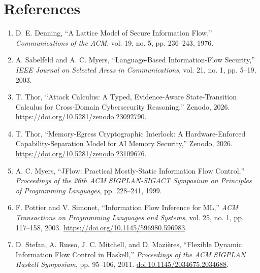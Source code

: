 \documentclass[11pt,letterpaper]{article}
\begin{document}
\section*{References}
\small
\begin{enumerate}\setlength{\itemsep}{2pt}\setlength{\parskip}{0pt}
\item D. E. Denning, ``A Lattice Model of Secure Information Flow,'' \emph{Communications of the ACM}, vol. 19, no. 5, pp. 236--243, 1976.
\item A. Sabelfeld and A. C. Myers, ``Language-Based Information-Flow Security,'' \emph{IEEE Journal on Selected Areas in Communications}, vol. 21, no. 1, pp. 5--19, 2003.
\item T. Thor, ``Attack Calculus: A Typed, Evidence-Aware State-Transition Calculus for Cross-Domain Cybersecurity Reasoning,'' Zenodo, 2026. \url{https://doi.org/10.5281/zenodo.23092790}.
\item T. Thor, ``Memory-Egress Cryptographic Interlock: A Hardware-Enforced Capability-Separation Model for AI Memory Security,'' Zenodo, 2026. \url{https://doi.org/10.5281/zenodo.23109676}.
\item A. C. Myers, ``JFlow: Practical Mostly-Static Information Flow Control,'' \emph{Proceedings of the 26th ACM SIGPLAN-SIGACT Symposium on Principles of Programming Languages}, pp. 228--241, 1999.
\item F. Pottier and V. Simonet, ``Information Flow Inference for ML,'' \emph{ACM Transactions on Programming Languages and Systems}, vol. 25, no. 1, pp. 117--158, 2003. \url{https://doi.org/10.1145/596980.596983}.
\item D. Stefan, A. Russo, J. C. Mitchell, and D. Mazi\`eres, ``Flexible Dynamic Information Flow Control in Haskell,'' \emph{Proceedings of the ACM SIGPLAN Haskell Symposium}, pp. 95--106, 2011. \href{https://doi.org/10.1145/2034675.2034688}{doi:10.1145/2034675.2034688}.
\end{enumerate}
\normalsize
\end{document}
